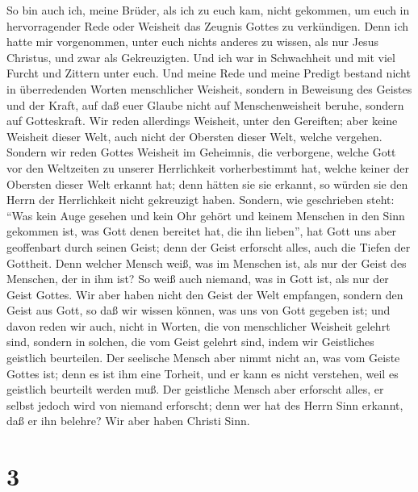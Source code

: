  So bin auch ich, meine Brüder, als ich zu euch kam, nicht
gekommen, um euch in hervorragender Rede oder Weisheit das Zeugnis
Gottes zu verkündigen.  Denn ich hatte mir vorgenommen,
unter euch nichts anderes zu wissen, als nur Jesus Christus, und zwar
als Gekreuzigten.  Und ich war in Schwachheit und mit viel
Furcht und Zittern unter euch.  Und meine Rede und meine
Predigt bestand nicht in überredenden Worten menschlicher Weisheit,
sondern in Beweisung des Geistes und der Kraft,  auf daß
euer Glaube nicht auf Menschenweisheit beruhe, sondern auf Gotteskraft.
 Wir reden allerdings Weisheit, unter den Gereiften; aber
keine Weisheit dieser Welt, auch nicht der Obersten dieser Welt, welche
vergehen.  Sondern wir reden Gottes Weisheit im Geheimnis,
die verborgene, welche Gott vor den Weltzeiten zu unserer Herrlichkeit
vorherbestimmt hat,  welche keiner der Obersten dieser
Welt erkannt hat; denn hätten sie sie erkannt, so würden sie den Herrn
der Herrlichkeit nicht gekreuzigt haben.  Sondern, wie
geschrieben steht: ``Was kein Auge gesehen und kein Ohr gehört und
keinem Menschen in den Sinn gekommen ist, was Gott denen bereitet hat,
die ihn lieben'',  hat Gott uns aber geoffenbart durch
seinen Geist; denn der Geist erforscht alles, auch die Tiefen der
Gottheit.  Denn welcher Mensch weiß, was im Menschen ist,
als nur der Geist des Menschen, der in ihm ist? So weiß auch niemand,
was in Gott ist, als nur der Geist Gottes.  Wir aber
haben nicht den Geist der Welt empfangen, sondern den Geist aus Gott, so
daß wir wissen können, was uns von Gott gegeben ist;  und
davon reden wir auch, nicht in Worten, die von menschlicher Weisheit
gelehrt sind, sondern in solchen, die vom Geist gelehrt sind, indem wir
Geistliches geistlich beurteilen.  Der seelische Mensch
aber nimmt nicht an, was vom Geiste Gottes ist; denn es ist ihm eine
Torheit, und er kann es nicht verstehen, weil es geistlich beurteilt
werden muß.  Der geistliche Mensch aber erforscht alles,
er selbst jedoch wird von niemand erforscht;  denn wer
hat des Herrn Sinn erkannt, daß er ihn belehre? Wir aber haben Christi
Sinn.

\hypertarget{section-2}{%
\section{3}\label{section-2}}

